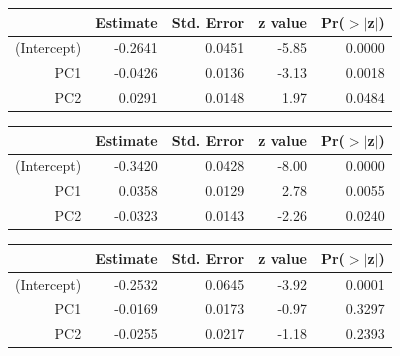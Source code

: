 \documentclass[a4paper,12pt]{Latex/Classes/PhDthesisPSnPDF}
\begin{document}
\begin{center}
\begin{table}[ht]
\centering
\begin{tabular}{rrrrr}
  \hline
 & Estimate & Std. Error & z value & Pr($>$$|$z$|$) \\ 
  \hline
(Intercept) & -0.2641 & 0.0451 & -5.85 & 0.0000 \\ 
  PC1 & -0.0426 & 0.0136 & -3.13 & 0.0018 \\ 
  PC2 & 0.0291 & 0.0148 & 1.97 & 0.0484 \\ 
   \hline
\end{tabular}
\end{table}\end{center}
\begin{center}
\begin{table}[ht]
\centering
\begin{tabular}{rrrrr}
  \hline
 & Estimate & Std. Error & z value & Pr($>$$|$z$|$) \\ 
  \hline
(Intercept) & -0.3420 & 0.0428 & -8.00 & 0.0000 \\ 
  PC1 & 0.0358 & 0.0129 & 2.78 & 0.0055 \\ 
  PC2 & -0.0323 & 0.0143 & -2.26 & 0.0240 \\ 
   \hline
\end{tabular}
\end{table}\end{center}

\newpage

\begin{center}
\begin{table}[ht]
\centering
\begin{tabular}{rrrrr}
  \hline
 & Estimate & Std. Error & z value & Pr($>$$|$z$|$) \\ 
  \hline
(Intercept) & -0.2532 & 0.0645 & -3.92 & 0.0001 \\ 
  PC1 & -0.0169 & 0.0173 & -0.97 & 0.3297 \\ 
  PC2 & -0.0255 & 0.0217 & -1.18 & 0.2393 \\ 
   \hline
\end{tabular}
\end{table}\end{center}
\end{document}
